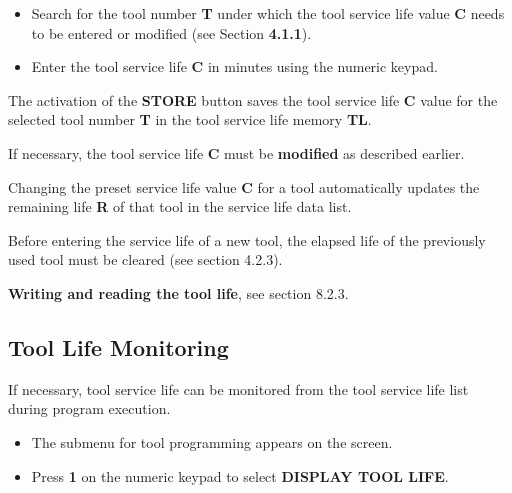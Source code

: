 \begin{itemize}
    \item Search for the tool number \textbf{T} under which the tool service life value \textbf{C} needs to be entered or modified (see Section \textbf{4.1.1}).
    \item Enter the tool service life \textbf{C} in minutes using the numeric keypad.
    \vspace{.6cm}
\end{itemize}
\vspace{.5cm}
The activation of the \textbf{STORE} button saves the tool service life \textbf{C} value for the selected tool number \textbf{T} in the tool service life memory \textbf{TL}.

\begin{itemize}
\end{itemize}

\notes

If necessary, the tool service life \textbf{C} must be \textbf{modified} as described earlier.

Changing the preset service life value \textbf{C} for a tool automatically updates the remaining life \textbf{R} of that tool in the service life data list.

Before entering the service life of a new tool, the elapsed life of the previously used tool must be cleared (see section 4.2.3).

\textbf{Writing and reading the tool life}, see section 8.2.3.

\newpage

\subsection{Tool Life Monitoring}

If necessary, tool service life can be monitored from the tool service life list during program execution.

\begin{itemize}
    \vspace{.5cm}
    \item The submenu for tool programming appears on the screen.
    \item Press \textbf{1} on the numeric keypad to select \textbf{DISPLAY TOOL LIFE}.
\end{itemize}

